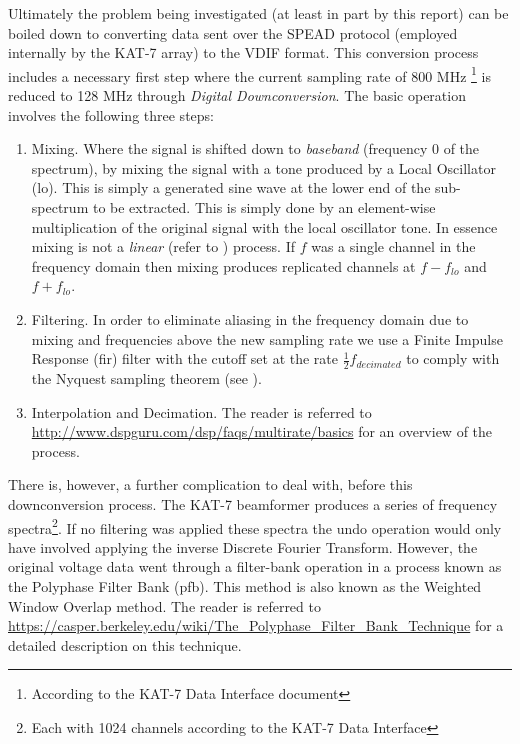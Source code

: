 \documentclass[a4paper,10pt]{article}
\begin{document}
Ultimately the problem being investigated (at least in part by this report) can be boiled down to converting data sent over the SPEAD protocol (employed 
internally by the KAT-7 array) to the VDIF format. This conversion process includes a necessary first step where the current sampling rate of 800 MHz
\footnote{According to the KAT-7 Data Interface document} is reduced to 128 MHz through \textit{Digital Downconversion}. The basic operation involves the following three
steps:
\begin{enumerate}
 \item Mixing. Where the signal is shifted down to \textit{baseband} (frequency 0 of the spectrum), by mixing the signal with a tone produced by a Local Oscillator (\gls{lo}).
 This is simply a generated sine wave at the lower end of the sub-spectrum to be extracted. This is simply done by an element-wise multiplication of the original signal with
 the local oscillator tone. In essence mixing is not a \textit{linear} (refer to \cite[ch. 5]{smith1997scientist}) process. If $f$ was a single channel in the 
 frequency domain then mixing produces replicated channels at $f - f_{lo}$ and $f + f_{lo}$.
 \item Filtering. In order to eliminate aliasing in the frequency domain due to mixing and frequencies above the new sampling rate we use a Finite Impulse Response 
 (\gls{fir}) filter with the cutoff set at the rate $\frac{1}{2}f_{decimated}$ to comply with the Nyquest sampling theorem (see \cite[ch. 3]{smith1997scientist}).
 \item Interpolation and Decimation. The reader is referred to \url{http://www.dspguru.com/dsp/faqs/multirate/basics} for an overview of the process.  
\end{enumerate}

There is, however, a further complication to deal with, before this downconversion process. The KAT-7 beamformer produces a series of frequency spectra\footnote{Each 
with 1024 channels according to the KAT-7 Data Interface}. If no filtering was applied these spectra the undo operation would only have involved applying the inverse
Discrete Fourier Transform. However, the original voltage data went through a filter-bank operation in a process known as the Polyphase Filter Bank (\gls{pfb}). This
method is also known as the Weighted Window Overlap method. The reader is referred to \url{https://casper.berkeley.edu/wiki/The_Polyphase_Filter_Bank_Technique} for a
detailed description on this technique.
\end{document}
